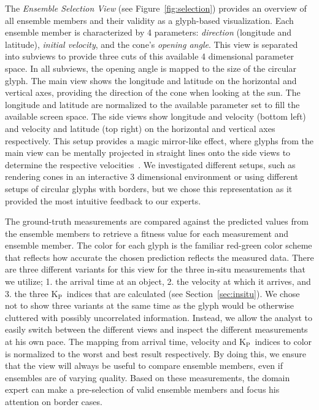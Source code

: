 \documentclass[journal]{vgtc}                %
\newcommand{\kpIndex}{$\textrm{K}_\textrm{P}$}
\begin{document}
The \emph{Ensemble Selection View} (see Figure~\ref{fig:selection}) provides an overview of all ensemble members and their validity as a glyph-based visualization. Each ensemble member is characterized by 4 parameters: \emph{direction} (longitude and latitude), \emph{initial velocity}, and the cone's \emph{opening angle}. This view is separated into subviews to provide three cuts of this available 4 dimensional parameter space. In all subviews, the opening angle is mapped to the size of the circular glyph. The main view shows the longitude and latitude on the horizontal and vertical axes, providing the direction of the cone when looking at the sun. The longitude and latitude are normalized to the available parameter set to fill the available screen space. The side views show longitude and velocity (bottom left) and velocity and latitude (top right) on the horizontal and vertical axes respectively. This setup provides a magic mirror-like effect, where glyphs from the main view can be mentally projected in straight lines onto the side views to determine the respective velocities~\cite{konig1999multiple}. We investigated different setups, such as rendering cones in an interactive 3 dimensional environment or using different setups of circular glyphs with borders, but we chose this representation as it provided the most intuitive feedback to our experts.

The ground-truth measurements are compared against the predicted values from the ensemble members to retrieve a fitness value for each measurement and ensemble member. The color for each glyph is the familiar red-green color scheme that reflects how accurate the chosen prediction reflects the measured data. There are three different variants for this view for the three in-situ measurements that we utilize; 1. the arrival time at an object, 2. the velocity at which it arrives, and 3. the three \kpIndex\ indices that are calculated (see Section~\ref{sec:insitu}). We chose not to show three variants at the same time as the glyph would be otherwise cluttered with possibly uncorrelated information. Instead, we allow the analyst to easily switch between the different views and inspect the different measurements at his own pace. The mapping from arrival time, velocity and \kpIndex\ indices to color is normalized to the worst and best result respectively. By doing this, we ensure that the view will always be useful to compare ensemble members, even if ensembles are of varying quality. Based on these measurements, the domain expert can make a pre-selection of valid ensemble members and focus his attention on border cases.
\end{document}
